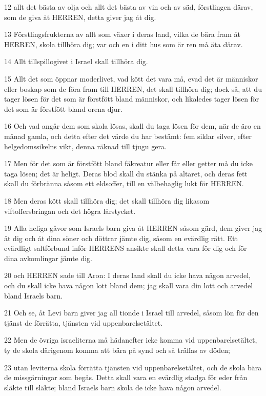 \par 12 allt det bästa av olja och allt det bästa av vin och av säd, förstlingen därav, som de giva åt HERREN, detta giver jag åt dig.
\par 13 Förstlingsfrukterna av allt som växer i deras land, vilka de bära fram åt HERREN, skola tillhöra dig; var och en i ditt hus som är ren må äta därav.
\par 14 Allt tillspillogivet i Israel skall tillhöra dig.
\par 15 Allt det som öppnar moderlivet, vad kött det vara må, evad det är människor eller boskap som de föra fram till HERREN, det skall tillhöra dig; dock så, att du tager lösen för det som är förstfött bland människor, och likaledes tager lösen för det som är förstfött bland orena djur.
\par 16 Och vad angår dem som skola lösas, skall du taga lösen för dem, när de äro en månad gamla, och detta efter det värde du har bestämt: fem siklar silver, efter helgedomssikelns vikt, denna räknad till tjugu gera.
\par 17 Men för det som är förstfött bland fäkreatur eller får eller getter må du icke taga lösen; det är heligt. Deras blod skall du stänka på altaret, och deras fett skall du förbränna såsom ett eldsoffer, till en välbehaglig lukt för HERREN.
\par 18 Men deras kött skall tillhöra dig; det skall tillhöra dig likasom viftoffersbringan och det högra lårstycket.
\par 19 Alla heliga gåvor som Israels barn giva åt HERREN såsom gärd, dem giver jag åt dig och åt dina söner och döttrar jämte dig, såsom en evärdlig rätt. Ett evärdligt saltförbund inför HERRENS ansikte skall detta vara för dig och för dina avkomlingar jämte dig.
\par 20 och HERREN sade till Aron: I deras land skall du icke hava någon arvedel, och du skall icke hava någon lott bland dem; jag skall vara din lott och arvedel bland Israels barn.
\par 21 Och se, åt Levi barn giver jag all tionde i Israel till arvedel, såsom lön för den tjänst de förrätta, tjänsten vid uppenbarelsetältet.
\par 22 Men de övriga israeliterna må hädanefter icke komma vid uppenbarelsetältet, ty de skola därigenom komma att bära på synd och så träffas av döden;
\par 23 utan leviterna skola förrätta tjänsten vid uppenbarelsetältet, och de skola bära de missgärningar som begås. Detta skall vara en evärdlig stadga för eder från släkte till släkte; bland Israels barn skola de icke hava någon arvedel.

